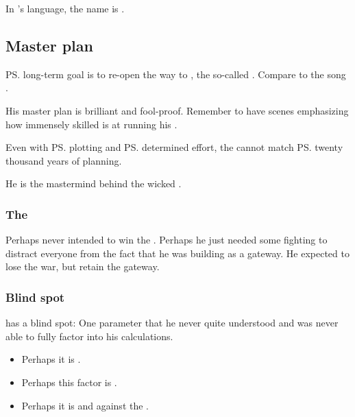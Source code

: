 In \Semiza's language, the name is \Amothanaxur.









\subsection{Master plan}
\ps{\Daggerrain}{} long-term goal is to re-open the way to \Erebos, the so-called . Compare to the song . 

His master plan is brilliant and fool-proof. Remember to have scenes emphasizing how immensely skilled \Daggerrain{} is at running his . 

Even with \ps{\HriistD}{} plotting and \ps{\Ishnaruchaefir} determined effort, the \dragons{} cannot match \ps{\Daggerrain}{} twenty thousand years of planning. 

He is the mastermind behind the wicked . 





\subsubsection{The \firstbanewar}
Perhaps \Daggerrain{} never intended to win the \firstbanewar. Perhaps he just needed some fighting to distract everyone from the fact that he was building \Nyx{} as a gateway. He expected to lose the war, but retain the gateway. 





\subsubsection{Blind spot}
\Daggerrain{} has a blind spot: 
One parameter that he never quite understood and was never able to fully factor into his calculations. 

\begin{itemize}
  \item 
    Perhaps it is . 
  \item 
    Perhaps this factor is .
  \item 
    Perhaps it is  and  against the \banes.
\end{itemize}















